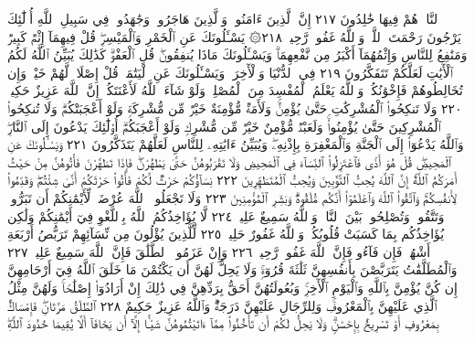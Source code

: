 ٱلنَّارِۖ هُمْ فِيهَا خَٰلِدُونَ ٢١٧ إِنَّ ٱلَّذِينَ ءَامَنُوا۟ وَٱلَّذِينَ
هَاجَرُوا۟ وَجَٰهَدُوا۟ فِي سَبِيلِ ٱللَّهِ أُو۟لَٰٓئِكَ يَرْجُونَ رَحْمَتَ
ٱللَّهِۚ وَٱللَّهُ غَفُورࣱ رَّحِيمࣱ ٢١٨۞ يَسْـَٔلُونَكَ عَنِ ٱلْخَمْرِ وَٱلْمَيْسِرِۖ
قُلْ فِيهِمَآ إِثْمࣱ كَبِيرࣱ وَمَنَٰفِعُ لِلنَّاسِ وَإِثْمُهُمَآ أَكْبَرُ
مِن نَّفْعِهِمَاۗ وَيَسْـَٔلُونَكَ مَاذَا يُنفِقُونَۖ قُلِ ٱلْعَفْوَۗ كَذَٰلِكَ
يُبَيِّنُ ٱللَّهُ لَكُمُ ٱلْأٓيَٰتِ لَعَلَّكُمْ تَتَفَكَّرُونَ ٢١٩
فِي ٱلدُّنْيَا وَٱلْأٓخِرَةِۗ وَيَسْـَٔلُونَكَ عَنِ ٱلْيَتَٰمَىٰۖ قُلْ إِصْلَاحࣱ لَّهُمْ
خَيْرࣱۖ وَإِن تُخَالِطُوهُمْ فَإِخْوَٰنُكُمْۚ وَٱللَّهُ يَعْلَمُ ٱلْمُفْسِدَ مِنَ
ٱلْمُصْلِحِۚ وَلَوْ شَآءَ ٱللَّهُ لَأَعْنَتَكُمْۚ إِنَّ ٱللَّهَ عَزِيزٌ حَكِيمࣱ ٢٢٠
وَلَا تَنكِحُوا۟ ٱلْمُشْرِكَٰتِ حَتَّىٰ يُؤْمِنَّۚ وَلَأَمَةࣱ مُّؤْمِنَةٌ
خَيْرࣱ مِّن مُّشْرِكَةࣲ وَلَوْ أَعْجَبَتْكُمْۗ وَلَا تُنكِحُوا۟ ٱلْمُشْرِكِينَ
حَتَّىٰ يُؤْمِنُوا۟ۚ وَلَعَبْدࣱ مُّؤْمِنٌ خَيْرࣱ مِّن مُّشْرِكࣲ وَلَوْ أَعْجَبَكُمْۗ
أُو۟لَٰٓئِكَ يَدْعُونَ إِلَى ٱلنَّارِۖ وَٱللَّهُ يَدْعُوٓا۟ إِلَى ٱلْجَنَّةِ وَٱلْمَغْفِرَةِ
بِإِذْنِهِۦۖ وَيُبَيِّنُ ءَايَٰتِهِۦ لِلنَّاسِ لَعَلَّهُمْ يَتَذَكَّرُونَ ٢٢١
وَيَسْـَٔلُونَكَ عَنِ ٱلْمَحِيضِۖ قُلْ هُوَ أَذࣰى فَٱعْتَزِلُوا۟ ٱلنِّسَآءَ فِي
ٱلْمَحِيضِ وَلَا تَقْرَبُوهُنَّ حَتَّىٰ يَطْهُرْنَۖ فَإِذَا تَطَهَّرْنَ فَأْتُوهُنَّ
مِنْ حَيْثُ أَمَرَكُمُ ٱللَّهُۚ إِنَّ ٱللَّهَ يُحِبُّ ٱلتَّوَّٰبِينَ وَيُحِبُّ ٱلْمُتَطَهِّرِينَ ٢٢٢
نِسَآؤُكُمْ حَرْثࣱ لَّكُمْ فَأْتُوا۟ حَرْثَكُمْ أَنَّىٰ شِئْتُمْۖ وَقَدِّمُوا۟
لِأَنفُسِكُمْۚ وَٱتَّقُوا۟ ٱللَّهَ وَٱعْلَمُوٓا۟ أَنَّكُم مُّلَٰقُوهُۗ وَبَشِّرِ
ٱلْمُؤْمِنِينَ ٢٢٣ وَلَا تَجْعَلُوا۟ ٱللَّهَ عُرْضَةࣰ لِّأَيْمَٰنِكُمْ أَن تَبَرُّوا۟
وَتَتَّقُوا۟ وَتُصْلِحُوا۟ بَيْنَ ٱلنَّاسِۚ وَٱللَّهُ سَمِيعٌ عَلِيمࣱ ٢٢٤
لَّا يُؤَاخِذُكُمُ ٱللَّهُ بِٱللَّغْوِ فِيٓ أَيْمَٰنِكُمْ وَلَٰكِن يُؤَاخِذُكُم بِمَا كَسَبَتْ
قُلُوبُكُمْۗ وَٱللَّهُ غَفُورٌ حَلِيمࣱ ٢٢٥ لِّلَّذِينَ يُؤْلُونَ مِن نِّسَآئِهِمْ تَرَبُّصُ
أَرْبَعَةِ أَشْهُرࣲۖ فَإِن فَآءُو فَإِنَّ ٱللَّهَ غَفُورࣱ رَّحِيمࣱ ٢٢٦ وَإِنْ عَزَمُوا۟
ٱلطَّلَٰقَ فَإِنَّ ٱللَّهَ سَمِيعٌ عَلِيمࣱ ٢٢٧ وَٱلْمُطَلَّقَٰتُ يَتَرَبَّصْنَ بِأَنفُسِهِنَّ
ثَلَٰثَةَ قُرُوٓءࣲۚ وَلَا يَحِلُّ لَهُنَّ أَن يَكْتُمْنَ مَا خَلَقَ ٱللَّهُ فِيٓ أَرْحَامِهِنَّ
إِن كُنَّ يُؤْمِنَّ بِٱللَّهِ وَٱلْيَوْمِ ٱلْأٓخِرِۚ وَبُعُولَتُهُنَّ أَحَقُّ بِرَدِّهِنَّ فِي
ذَٰلِكَ إِنْ أَرَادُوٓا۟ إِصْلَٰحࣰاۚ وَلَهُنَّ مِثْلُ ٱلَّذِي عَلَيْهِنَّ بِٱلْمَعْرُوفِۚ
وَلِلرِّجَالِ عَلَيْهِنَّ دَرَجَةࣱۗ وَٱللَّهُ عَزِيزٌ حَكِيمٌ ٢٢٨ ٱلطَّلَٰقُ مَرَّتَانِۖ
فَإِمْسَاكُۢ بِمَعْرُوفٍ أَوْ تَسْرِيحُۢ بِإِحْسَٰنࣲۗ وَلَا يَحِلُّ لَكُمْ أَن تَأْخُذُوا۟
مِمَّآ ءَاتَيْتُمُوهُنَّ شَيْـًٔا إِلَّآ أَن يَخَافَآ أَلَّا يُقِيمَا حُدُودَ ٱللَّهِۖ
